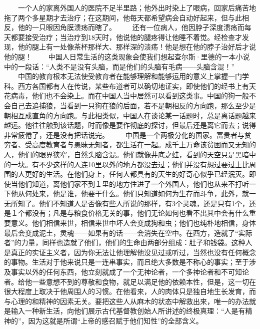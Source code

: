 \documentclass[12pt,oneside]{book}
\begin{document}
\begin{common-format}
　　一个人的家离外国人的医院不足半里路；他外出时染上了眼病，回家后痛苦地拖了两个多星期才去治疗；在这期间，他每天都希望病会自动好起来，但与此相反，他的一只眼因角膜溃疡而瞎了。 
　　还有一位病人，他因脖子深度溃疡而每天都要接受治疗；当治疗到18天时，他说他的腿疼得让他睡不着觉。经检查才发现，他的腿上有一处像茶杯那样大、那样深的溃疡！他是想在他的脖子治好后才说他的腿！ 
　　中国人日常生活的这类现象会使我们想起查尔斯·里德的一本小说中的一段话：“人类不是没有头脑，而是他们的头脑有毛病——头脑含混！” 
　　中国的教育根本无法使受教育者在能够理解和能够运用的意义上掌握一门学科。西方各国都有人在传说，某些布道者可以确切地证实，即使他们的经书上有天花病毒，他们也不会染上。而在中国人当中居然可以看到这类事。中国的狗一般不会自己去追捕狼，当看到一只狗在狼的后面，若不是朝相反的方向跑，那么至少是朝相互成直角的方向跑。与此相类似，中国人在谈论某一话题时，总是离话题越来越远。他往往触到该话题，时而像是要作彻底的探讨，但最后还是离它而去；说得非常疲倦了，还是没有把话说完。 
　　中国是一个两极分化的国家。富贵者与贫穷者、受高度教育者与愚昧无知者，都生活在一起。成千上万命该贫困而又无知的人，他们的眼界狭窄，自然头脑含混。他们就像井底之蛙，看到的天空只是黑暗中的一块。有不少这样的人连10里以外的地方都没去过；他们并没有想过要过上比周围的人更好的生活。在他们身上，任何人都具有的天生的好奇心似乎已经泯灭。即使当他们知道，离他们家不到１里的地方住进了一个外国人，他们也从来不打听一下他从何处来，他是谁，他要干什么。他们只知道如何为生存而斗争，此外，就一无所知了。他们不知道人是否像有些人所说的那样，有3个灵魂，还是只有1个，还是１个都没有；凡是与粮食价格无关的事，他们无论如何也看不出其中会有什么重要意义。他们相信来世，相信来世中坏人会变成狗和虫；他们也纯朴地相信，身体最后会变成泥土，灵魂——如果有的话——会消失在空中。在西方，造就了“实际者”的力量，同样也造就了他们，他们的生命由两部分组成：肚子和钱袋。这种人是真正的实证主义者，因为你无法让他理解他没见过或听过，当然也没有任何概念的事物。生活对于他来说只是一连串事实，而且绝大多数是不称心的事实；至于涉及事实以外的任何东西，他立刻就成了一个无神论者，一个多神论者和不可知论者。给他一些意想不到的尊敬和食物，就足以满足他的依赖本性，但是，这一切在很大程度上取决于他周围人的习惯。在他看来，人的肉体只是独自地生长发育，而与心理的和精神的因素无关。要把这些人从麻木的状态中解救出来，唯一的办法就是输入一种新生活，向他们展示古代基督教创始人所讲述的终极真理：“人是有精神的”，因为这就是所谓“上帝的感召赋于他们知性”的全部含义。 


\end{common-format}
\end{document}
